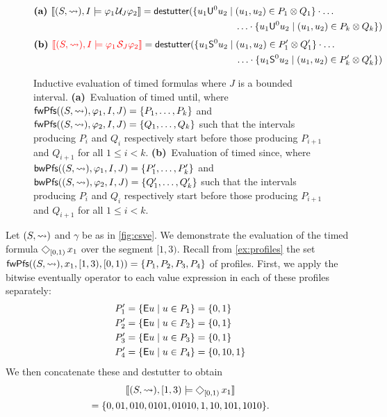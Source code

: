 \begin{figure*}[!t]
	\begin{align*}
		\textbf{(a) }
		\llbracket (S, {\hb}), I \models \varphi_1 \until_J \varphi_2 \rrbracket = \destutter( \{ u_1 \mathsf{U}^0 u_2 \st &(u_1, u_2) \in P_1 \otimes Q_1 \} \cdot \ldots \\ 
		&\ldots \cdot \{ u_1 \mathsf{U}^0 u_2 \st (u_1, u_2) \in P_k \otimes Q_k \} )
	\end{align*}
	\begin{align*}
		\textbf{(b) }
		\bgroup \color{red} \llbracket (S, {\hb}), I \models \varphi_1 \since_J \varphi_2 \rrbracket \egroup = \destutter( \{ u_1 \mathsf{S}^0 u_2 \st &(u_1, u_2) \in P_1' \otimes Q_1' \} \cdot \ldots \\ 
		&\ldots \cdot \{ u_1 \mathsf{S}^0 u_2 \st (u_1, u_2) \in P_k' \otimes Q_k' \} )
	\end{align*}
	\caption{Inductive evaluation of timed formulas where $J$ is a bounded interval.
		\textbf{(a)}~Evaluation of timed until, where $\mathsf{fwPfs}((S,{\rightsquigarrow}), \varphi_1, I, J) = \{P_1, \ldots, P_k \}$ and $\mathsf{fwPfs}((S,{\rightsquigarrow}), \varphi_2, I, J) = \{Q_1, \ldots, Q_k \}$ such that the intervals producing $P_i$ and $Q_i$ respectively start before those producing $P_{i+1}$ and $Q_{i+1}$ for all $1 \leq i < k$.
		\textbf{(b)}~Evaluation of timed since, where $\mathsf{bwPfs}((S,{\rightsquigarrow}), \varphi_1, I, J) = \{P_1', \ldots, P_k' \}$ and $\mathsf{bwPfs}((S,{\rightsquigarrow}), \varphi_2, I, J) = \{Q_1', \ldots, Q_k' \}$ such that the intervals producing $P_i$ and $Q_i$ respectively start before those producing $P_{i+1}$ and $Q_{i+1}$ for all $1 \leq i < k$.
		\label{fig:timedEval}}
\end{figure*}

\begin{example} \label{ex:timed}
	Let $(S, {\rightsquigarrow})$ and $\gamma$ be as in \cref{fig:csve}.
	We demonstrate the evaluation of the timed formula $\LTLeventually_{[0,1)} x_1$ over the segment $[1,3)$.
	Recall from \cref{ex:profiles} the set $\mathsf{fwPfs}((S,{\rightsquigarrow}), x_1, [1,3), [0,1)) = \{P_1, P_2, P_3, P_4\}$ of profiles.
	First, we apply the bitwise eventually operator to each value expression in each of these profiles separately:
	\begin{align*}
		P_1' &= \{ \mathsf{E} u \st u \in P_1 \} = \{ 0, 1 \} \\
		P_2' &= \{ \mathsf{E} u \st u \in P_2 \} = \{ 0, 1 \} \\
		P_3' &= \{ \mathsf{E} u \st u \in P_3 \} = \{ 0, 1 \} \\
		P_4' &= \{ \mathsf{E} u \st u \in P_4 \} = \{ 0, 10, 1 \} \\
	\end{align*}
	We then concatenate these and destutter to obtain 
	\begin{multline*}
		\llbracket (S, {\hb}), [1,3) \models \LTLeventually_{[0,1)} x_1 \rrbracket \\= \{ 0, 01, 010, 0101, 01010, 1, 10, 101, 1010 \}. 
	\end{multline*}
\end{example}

